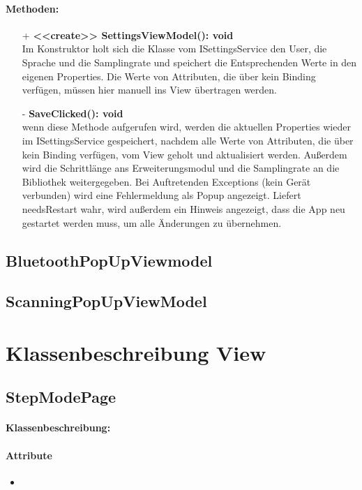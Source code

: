 \documentclass[a4paper,12pt]{article}
\begin{document}
\paragraph{Methoden:}
\begin{itemize}
    \item[+] \textbf{<<create>> SettingsViewModel(): void}\\ Im Konstruktor holt sich die Klasse vom ISettingsService den User, die Sprache und die Samplingrate und speichert die Entsprechenden Werte in den eigenen Properties. Die Werte von Attributen, die über kein Binding verfügen, müssen hier manuell ins View übertragen werden.
    \item[-] \textbf{SaveClicked(): void}\\ wenn diese Methode aufgerufen wird, werden die aktuellen Properties wieder im ISettingsService gespeichert, nachdem alle Werte von Attributen, die über kein Binding verfügen, vom View geholt und aktualisiert werden. Außerdem wird die Schrittlänge ans Erweiterungsmodul und die Samplingrate an die Bibliothek weitergegeben. Bei Auftretenden Exceptions (kein Gerät verbunden) wird eine Fehlermeldung als Popup angezeigt. Liefert needsRestart wahr, wird außerdem ein Hinweis angezeigt, dass die App neu gestartet werden muss, um alle Änderungen zu übernehmen. 
\end{itemize} 

\subsection{BluetoothPopUpViewmodel}

\subsection{ScanningPopUpViewModel}

\section{Klassenbeschreibung View}
	\subsection{StepModePage}
	\paragraph{Klassenbeschreibung:}
	\paragraph{Attribute}
		\begin{itemize}
			\item
		\end{itemize}
	
\end{document}
